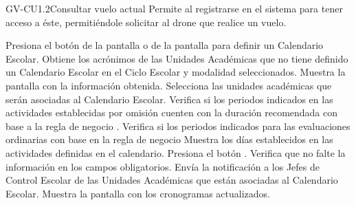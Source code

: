 \begin{UseCase}{GV-CU1.2}{Consultar vuelo actual}{
		Permite al  registrarse en el sistema para tener acceso a éste, permitiéndole solicitar al drone que realice un vuelo.
	}
{\begin{Titemize}
			\Titem {}
		\end{Titemize}				
	}
\end{UseCase}



\begin{UCtrayectoria}
	\UCpaso [\UCactor] Presiona el botón  de la pantalla  o de la pantalla  para definir un Calendario Escolar.
	\UCpaso Obtiene los acrónimos de las Unidades Académicas que no tiene definido un Calendario Escolar en el Ciclo Escolar y modalidad seleccionados. 	
	\UCpaso Muestra la pantalla  con la información obtenida.
	\UCpaso [\UCactor] Selecciona las unidades académicas que serán asociadas al Calendario Escolar.    
	\UCpaso Verifica si los periodos indicados en las actividades establecidas por omisión cuenten con la duración recomendada con base a la regla de negocio . 
	\UCpaso Verifica si los periodos indicados para las evaluaciones ordinarias con base en la regla de negocio     
	\UCpaso \label{IN-DAE-CU2.1:dia}Muestra los días establecidos en las actividades definidas en el calendario.
	\UCpaso [\UCactor] Presiona el botón . 
	\UCpaso Verifica que no falte la información en los  campos obligatorios. 
	\UCpaso Envía la notificación a los Jefes de Control Escolar de las Unidades Académicas que están asociadas al Calendario Escolar.
	\UCpaso Muestra la pantalla  con los cronogramas actualizados.
\end{UCtrayectoria}


